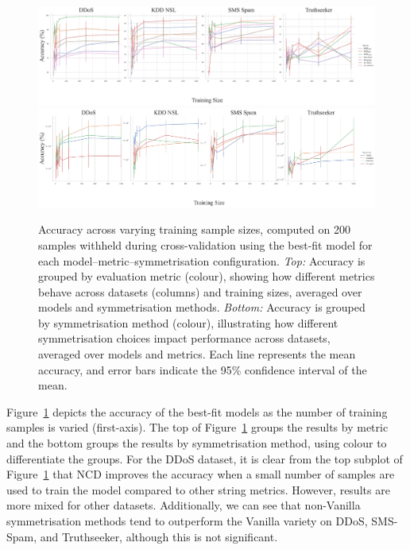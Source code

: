 \documentclass[preprint,12pt]{article}
\begin{document}
\begin{figure}[!bht]
    \centering
    \includegraphics[width=\textwidth]{images/accuracy_vs_sample_size_vs_metric.pdf}
    \hfill
    \includegraphics[width=\textwidth]{images/accuracy_vs_sample_size_vs_symmetric.pdf}
    \caption{
        Accuracy across varying training sample sizes, computed on 200 samples withheld during cross-validation using the best-fit model for each model–metric–symmetrisation configuration. \textit{Top:} Accuracy is grouped by evaluation metric (colour), showing how different metrics behave across datasets (columns) and training sizes, averaged over models and symmetrisation methods. \textit{Bottom:} Accuracy is grouped by symmetrisation method (colour), illustrating how different symmetrisation choices impact performance across datasets, averaged over models and metrics. Each line represents the mean accuracy, and error bars indicate the 95\% confidence interval of the mean.
    }
    \label{fig:sample_size}
\end{figure}

Figure~\ref{fig:sample_size} depicts the accuracy of the best-fit models as the number of training samples is varied (first-axis). 
The top of Figure~\ref{fig:sample_size} groups the results by metric and the bottom groups the results by symmetrisation method, using colour to differentiate the groups. 
For the DDoS dataset, it is clear from the top subplot of Figure~\ref{fig:sample_size} that NCD improves the accuracy when a small number of samples are used to train the model compared to other string metrics. 
However, results are more mixed for other datasets. 
Additionally, we can see that non-Vanilla symmetrisation methods tend to outperform the Vanilla variety on DDoS, SMS-Spam, and Truthseeker, although this is not significant.
\end{document}
